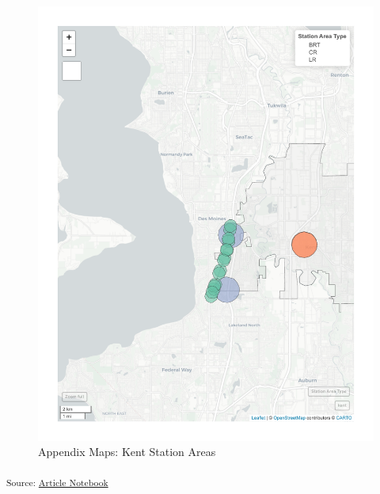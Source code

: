 \documentclass[
]{agujournal2019}
\begin{document}
\begin{figure}[H]

{\centering \includegraphics{index_files/figure-pdf/appendix-case-studies-kent-stations-map-1.pdf}

}

\caption{Appendix Maps: Kent Station Areas}

\end{figure}%

\textsubscript{Source:
\href{https://tiernanmartin.github.io/2024-transit-oriented-development-bill/index.qmd.html}{Article
Notebook}}
\end{document}
